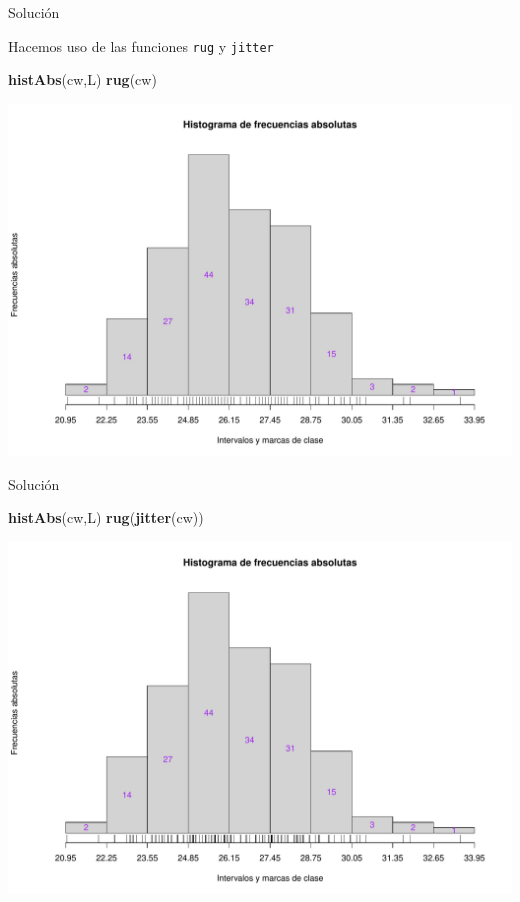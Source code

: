 \documentclass[
  ignorenonframetext,
]{beamer}
\newenvironment{Shaded}{\begin{snugshade}}{\end{snugshade}}
\newcommand{\KeywordTok}[1]{\textcolor[rgb]{0.13,0.29,0.53}{\textbf{#1}}}
\newcommand{\NormalTok}[1]{#1}
\begin{document}
\begin{frame}[fragile]{Solución}
\protect\hypertarget{soluciuxf3n-41}{}

Hacemos uso de las funciones \texttt{rug} y \texttt{jitter}

\begin{Shaded}
\begin{Highlighting}[]
\KeywordTok{histAbs}\NormalTok{(cw,L)}
\KeywordTok{rug}\NormalTok{(cw)}
\end{Highlighting}
\end{Shaded}

\includegraphics{Tema9.-Agrupacion_datos_cuantitativos_files/figure-beamer/unnamed-chunk-56-1.pdf}

\end{frame}

\begin{frame}[fragile]{Solución}
\protect\hypertarget{soluciuxf3n-42}{}

\begin{Shaded}
\begin{Highlighting}[]
\KeywordTok{histAbs}\NormalTok{(cw,L)}
\KeywordTok{rug}\NormalTok{(}\KeywordTok{jitter}\NormalTok{(cw))}
\end{Highlighting}
\end{Shaded}

\includegraphics{Tema9.-Agrupacion_datos_cuantitativos_files/figure-beamer/unnamed-chunk-57-1.pdf}

\end{frame}
\end{document}
